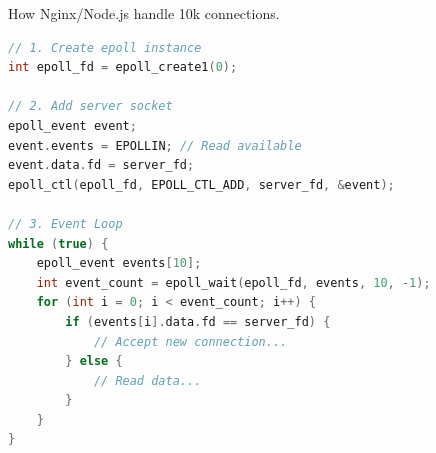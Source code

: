 How Nginx/Node.js handle 10k connections.

\begin{lstlisting}[language={C++}]
// 1. Create epoll instance
int epoll_fd = epoll_create1(0);

// 2. Add server socket
epoll_event event;
event.events = EPOLLIN; // Read available
event.data.fd = server_fd;
epoll_ctl(epoll_fd, EPOLL_CTL_ADD, server_fd, &event);

// 3. Event Loop
while (true) {
    epoll_event events[10];
    int event_count = epoll_wait(epoll_fd, events, 10, -1);
    for (int i = 0; i < event_count; i++) {
        if (events[i].data.fd == server_fd) {
            // Accept new connection...
        } else {
            // Read data...
        }
    }
}
\end{lstlisting}
